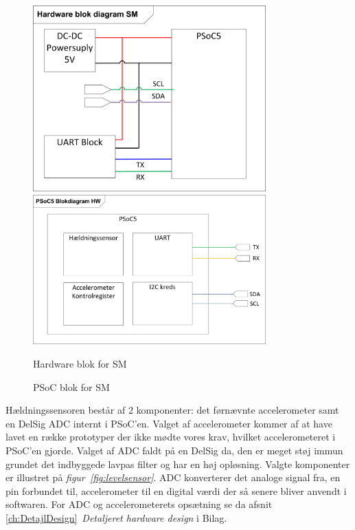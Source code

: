 \begin{figure}[H]
	\centering
	\begin{minipage}[b]{0.48\textwidth}\centering
	\includegraphics[width=0.80\textwidth]{billeder/SMHardware}
	\end{minipage}
	\begin{minipage}[b]{0.48\textwidth}\centering
	\includegraphics[width=0.80\textwidth]{billeder/SMPSoCblock}
	\end{minipage}
	\begin{minipage}[t]{0.48\textwidth}
	\caption{Hardware blok for SM}
	\label{fig:SMHW1}
	\end{minipage}
	\begin{minipage}[t]{0.48\textwidth}
	\caption{PSoC blok for SM}
	\label{fig:SMPSOC1}
	\end{minipage}
\end{figure}
Hældningssensoren består af 2 komponenter: det førnævnte accelerometer samt en DelSig ADC internt i PSoC'en. Valget af accelerometer kommer af at have lavet en række prototyper der ikke mødte vores krav, hvilket accelerometeret i PSoC'en gjorde. Valget af ADC faldt på en DelSig da, den er meget støj immun grundet det indbyggede lavpas filter og har en høj opløsning. Valgte komponenter er illustret på \textit{figur~\ref{fig:levelsensor}}. ADC konverterer det analoge signal fra, en pin forbundet til, accelerometer til en digital værdi der så senere bliver anvendt i softwaren. For ADC og accelerometerets opsætning se da afsnit \ref{ch:DetajlDesign}~\textit{Detaljeret hardware design} i Bilag.
